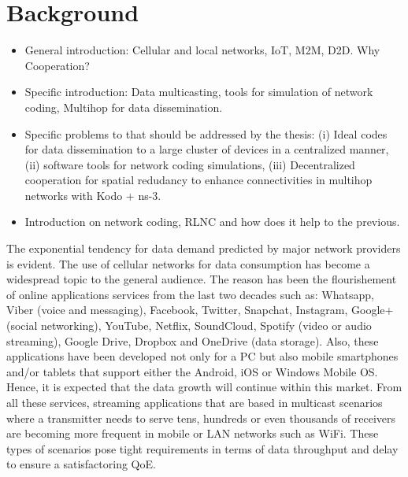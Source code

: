 \section{Background}\label{sec:background}

\begin{itemize}
\item General introduction: Cellular and local networks, \ac{IoT}, \ac{M2M}, \ac{D2D}. Why Cooperation?
\item Specific introduction: Data multicasting, tools for simulation of network coding, Multihop for data dissemination.
\item Specific problems to that should be addressed by the thesis: (i) Ideal codes for data dissemination to a large cluster of devices in a centralized manner, (ii) software tools for network coding simulations, (iii) Decentralized cooperation for spatial redudancy to enhance connectivities in multihop networks with Kodo + ns-3.
\item Introduction on network coding, RLNC and how does it help to the previous.
\end{itemize}

The exponential tendency for data demand predicted by major network providers \cite{cisco2016forecast,kremling2015presentation} is evident. The use of cellular networks for data consumption has become a widespread topic to the general audience. The reason has been the flourishement of online applications services from the last two decades such as:  Whatsapp, Viber (voice and messaging), Facebook, Twitter, Snapchat, Instagram, Google+ (social networking), YouTube, Netflix, SoundCloud, Spotify (video or audio streaming), Google Drive, Dropbox and OneDrive (data storage). Also, these applications have been developed not only for a \ac{PC} but also mobile smartphones and/or tablets that support either the Android, iOS or Windows Mobile \ac{OS}. Hence, it is expected that the data growth will continue within this market. From all these services, streaming applications that are based in multicast scenarios where a transmitter needs to serve tens, hundreds or even thousands of receivers are becoming more frequent in mobile or \ac{LAN} networks such as \ac{WiFi}. These types of scenarios pose tight requirements in terms of data throughput and delay to ensure a satisfactoring \ac{QoE}.

